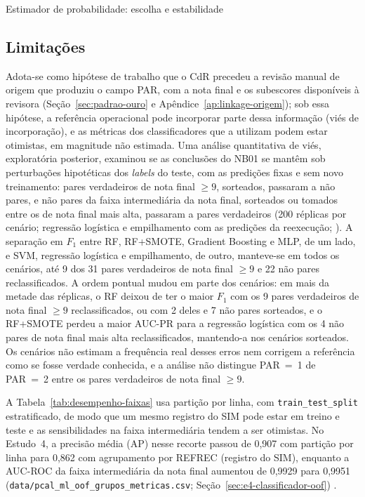 \begin{chapter}{Estimador de probabilidade: escolha e estabilidade}
\subsection{Limitações}\label{sec:e2-limitacoes}

Adota-se como hipótese de trabalho que o CdR precedeu a revisão manual de origem que produziu o campo PAR, com a nota final e os subescores disponíveis à revisora (Seção~\ref{sec:padrao-ouro} e Apêndice~\ref{ap:linkage-origem}); sob essa hipótese, a referência operacional pode incorporar parte dessa informação (viés de incorporação), e as métricas dos classificadores que a utilizam podem estar otimistas, em magnitude não estimada. Uma análise quantitativa de viés, exploratória posterior, examinou se as conclusões do NB01 se mantêm sob perturbações hipotéticas dos \textit{labels} do teste, com as predições fixas e sem novo treinamento: pares verdadeiros de nota final $\geq 9$, sorteados, passaram a não pares, e não pares da faixa intermediária da nota final, sorteados ou tomados entre os de nota final mais alta, passaram a pares verdadeiros (200 réplicas por cenário; regressão logística e empilhamento com as predições da reexecução; ). A separação em $F_1$ entre RF, RF+SMOTE, Gradient Boosting e MLP, de um lado, e SVM, regressão logística e empilhamento, de outro, manteve-se em todos os cenários, até 9 dos 31 pares verdadeiros de nota final $\geq 9$ e 22 não pares reclassificados. A ordem pontual mudou em parte dos cenários: em mais da metade das réplicas, o RF deixou de ter o maior $F_1$ com os 9 pares verdadeiros de nota final $\geq 9$ reclassificados, ou com 2 deles e 7 não pares sorteados, e o RF+SMOTE perdeu a maior AUC-PR para a regressão logística com os 4 não pares de nota final mais alta reclassificados, mantendo-a nos cenários sorteados. Os cenários não estimam a frequência real desses erros nem corrigem a referência como se fosse verdade conhecida, e a análise não distingue PAR~=~1 de PAR~=~2 entre os pares verdadeiros de nota final $\geq 9$.

A Tabela~\ref{tab:desempenho-faixas} usa partição por linha, com \texttt{train\_test\_split} estratificado, de modo que um mesmo registro do SIM pode estar em treino e teste e as sensibilidades na faixa intermediária tendem a ser otimistas. No Estudo~4, a precisão média (AP) nesse recorte passou de 0,907 com partição por linha para 0,862 com agrupamento por REFREC (registro do SIM), enquanto a AUC-ROC da faixa intermediária da nota final aumentou de 0,9929 para 0,9951 (\texttt{data/pcal\_ml\_oof\_grupos\_metricas.csv}; Seção~\ref{sec:e4-classificador-oof}) \cite{Jardim2026phdrepo}.


\end{chapter}
